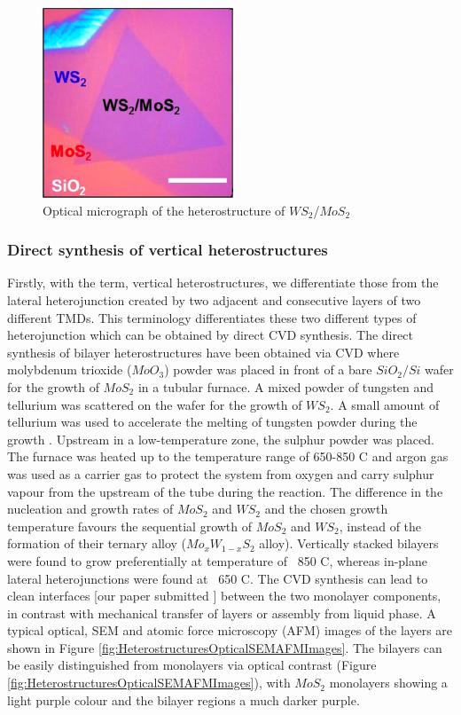 \begin{figure}[h]
	\begin{center}
		\includegraphics[scale=1]{Heterostructures/HeterostructureOpticalMap.png}
		\caption{Optical micrograph of the heterostructure of $WS_2$/$MoS_2$}
		\label{fig:HeterostructuresOpticalMap}
	\end{center}
\end{figure}

\subsubsection{Direct synthesis of vertical heterostructures}

Firstly, with the term, vertical heterostructures, we differentiate those from the lateral heterojunction created by two adjacent and consecutive layers of two different TMDs.
This terminology differentiates these two different types of heterojunction which can be obtained by direct CVD synthesis.
The direct synthesis of bilayer heterostructures have been obtained via CVD where molybdenum trioxide ($MoO_3$) powder was placed in  front of a bare $SiO_2/Si$ wafer for the growth of $MoS_2$ in a tubular furnace. A mixed powder of tungsten and tellurium was scattered on the wafer for the growth of $WS_2$. A small amount of tellurium was used to accelerate the melting of tungsten powder during the growth \cite{Gong2014}. Upstream in a low-temperature zone, the sulphur powder was placed. The furnace was heated up to the temperature range of 650-850 {\degree}C and argon gas was used as a carrier gas to protect the system from oxygen and carry sulphur vapour from the upstream of the tube during the reaction. The difference in the nucleation and growth rates of $MoS_2$ and $WS_2$ and the chosen growth temperature favours the sequential growth of $MoS_2$ and $WS_2$, instead of  the formation of their ternary alloy ($Mo_xW_{1-x}S_2$ alloy). Vertically stacked bilayers were found to grow preferentially at temperature of ~850 {\degree}C, whereas in-plane lateral heterojunctions were found at ~650 {\degree}C. The CVD  synthesis can lead to clean interfaces \cite{Gong2014}[our paper submitted ] between the two monolayer components, in contrast with mechanical transfer of layers or assembly from liquid phase. A typical optical, SEM and atomic force microscopy (AFM) images of the layers are shown in Figure \ref{fig:HeterostructuresOpticalSEMAFMImages}. The bilayers can be easily distinguished from monolayers via optical contrast (Figure \ref{fig:HeterostructuresOpticalSEMAFMImages}), with $MoS_2$ monolayers showing a light purple colour and the bilayer regions a much darker purple.

